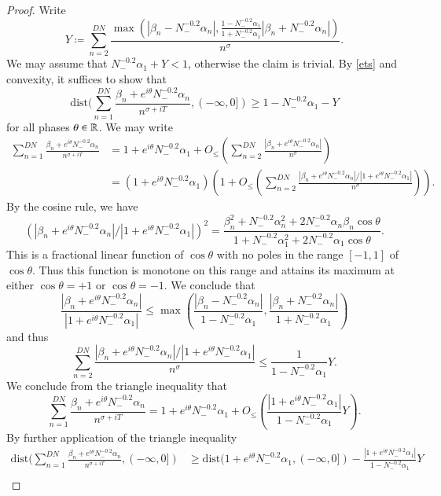 \begin{proof}
Write 
$$ Y \coloneqq \sum_{n=2}^{DN} \frac{\max(|\beta_n-N_-^{-0.2} \alpha_n|, \frac{1-N_-^{-0.2} \alpha_1}{1+N_-^{-0.2} \alpha_1} |\beta_n+N_-^{-0.2} \alpha_n|)}{n^{\sigma}}.$$
We may assume that $N_-^{-0.2} \alpha_1+Y < 1$, otherwise the claim is trivial.  By \eqref{ets} and convexity, it suffices to show that
$$
\mathrm{dist}( \sum_{n=1}^{DN} \frac{\beta_n + e^{i\theta} N_-^{-0.2} \alpha_n}{n^{\sigma+iT}}, (-\infty,0]) \geq 1 - N_-^{-0.2} \alpha_1 - Y$$
for all phases $\theta \in \mathbb{R}$.  We may write
\begin{align*}
\sum_{n=1}^{DN} \frac{\beta_n + e^{i\theta} N_-^{-0.2} \alpha_n}{n^{\sigma+iT}} &= 1 + e^{i\theta} N_-^{-0.2} \alpha_1 + O_{\leq}( \sum_{n=2}^{DN}
\frac{|\beta_n + e^{i\theta} N_-^{-0.2} \alpha_n|}{n^{\sigma}} ) \\
&=
(1 + e^{i\theta} N_-^{-0.2} \alpha_1) (1 + O_{\leq}( \sum_{n=2}^{DN}
\frac{|\beta_n + e^{i\theta} N_-^{-0.2} \alpha_n|/|1+e^{i\theta} N_-^{-0.2} \alpha_1|}{n^{\sigma}} ) ).
\end{align*}
By the cosine rule, we have
$$ \left(|\beta_n + e^{i\theta} N_-^{-0.2} \alpha_n| / |1 + e^{i\theta} N_-^{-0.2} \alpha_1|\right)^2 = \frac{\beta_n^2 + N_-^{-0.2} \alpha_n^2 + 2 N_-^{-0.2} \alpha_n \beta_n \cos \theta}{1 + N_-^{-0.2} \alpha_1^2 + 2 N_-^{-0.2} \alpha_1 \cos \theta}.$$
This is a fractional linear function of $\cos \theta$ with no poles in the range $[-1,1]$ of $\cos \theta$.  Thus this function is monotone on this range and attains its maximum at either $\cos \theta=+1$ or $\cos \theta = -1$.  We conclude that
$$ \frac{|\beta_n + e^{i\theta} N_-^{-0.2} \alpha_n|}{|1 + e^{i\theta} N_-^{-0.2} \alpha_1|} \leq \max\left( \frac{|\beta_n-N_-^{-0.2} \alpha_n|}{1-N_-^{-0.2} \alpha_1}, \frac{|\beta_n+N_-^{-0.2} \alpha_n|}{1+N_-^{-0.2} \alpha_1} \right)$$
and thus
$$ \sum_{n=2}^{DN} \frac{|\beta_n + e^{i\theta} N_-^{-0.2} \alpha_n|/|1+e^{i\theta} N_-^{-0.2} \alpha_1|}{n^{\sigma}} \leq \frac{1}{1-N_-^{-0.2} \alpha_1} Y.$$
We conclude from the triangle inequality that
$$ \sum_{n=1}^{DN} \frac{\beta_n + e^{i\theta} N_-^{-0.2} \alpha_n}{n^{\sigma+iT}} = 1 + e^{i\theta} N_-^{-0.2} \alpha_1 + O_{\leq}( \frac{|1+e^{i\theta} N_-^{-0.2} \alpha_1|}{1-N_-^{-0.2} \alpha_1} Y ).$$
By further application of the triangle inequality
\begin{align*}
\mathrm{dist}( \sum_{n=1}^{DN} \frac{\beta_n + e^{i\theta} N_-^{-0.2} \alpha_n}{n^{\sigma+iT}}, (-\infty,0]) &\geq \mathrm{dist}( 1 + e^{i\theta} N_-^{-0.2} \alpha_1, (-\infty,0]) - \frac{|1+e^{i\theta} N_-^{-0.2} \alpha_1|}{1-N_-^{-0.2} \alpha_1} Y \\

\end{align*}
\end{proof}
